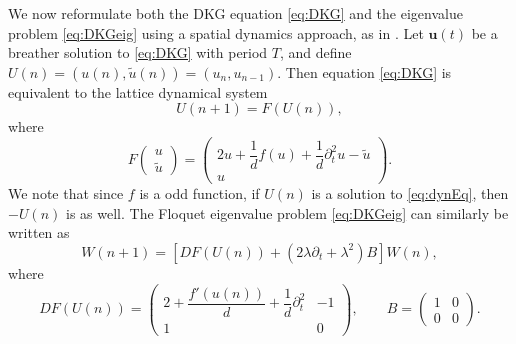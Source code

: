 \documentclass[12pt,reqno]{amsart}
\newcommand{\uvec}{\mathbf{u}}
\theoremstyle{definition}
\begin{document}
We now reformulate both the DKG equation \cref{eq:DKG} and the eigenvalue problem \cref{eq:DKGeig} using a spatial dynamics approach, as in \cites{Parker2020,Parker2021}. Let $\uvec(t)$ be a breather solution to \cref{eq:DKG} with period $T$, and define $U(n) = (u(n), \tilde{u}(n)) = ( u_n, u_{n-1} )$. Then equation \cref{eq:DKG} is equivalent to the lattice dynamical system
\begin{equation}\label{eq:dynEq}
U(n+1) = F(U(n)),
\end{equation}
where
\begin{equation}\label{eq:F}
F\begin{pmatrix}u \\ \tilde{u} \end{pmatrix} = 
\begin{pmatrix}2u  + \dfrac{1}{d}f(u) + \dfrac{1}{d} \partial_t^2 u - \tilde{u} \\
u
\end{pmatrix}.
\end{equation}
We note that since $f$ is a odd function, if $U(n)$ is a solution to \cref{eq:dynEq}, then $-U(n)$ is as well. The Floquet eigenvalue problem \cref{eq:DKGeig} can similarly be written as 
\begin{equation}\label{eq:dynEVP}
W(n+1) = \left[ DF(U(n)) + (2 \lambda \partial_t + \lambda^2) B \right] W(n),
\end{equation}
where
\begin{equation}\label{eq:DFU}
DF(U(n)) = \begin{pmatrix}
2 + \dfrac{f'(u(n))}{d} + \dfrac{1}{d}\partial_t^2  & -1 \\ 1 & 0
\end{pmatrix}, \qquad
B = \begin{pmatrix} 1 & 0 \\ 0 & 0 \end{pmatrix}.
\end{equation}
\end{document}
